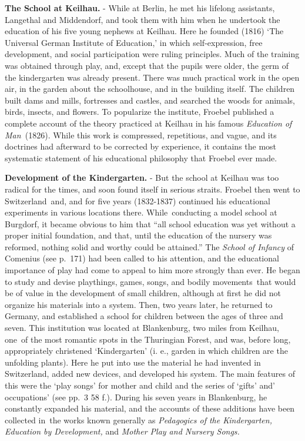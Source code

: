 \documentclass[]{book}
\begin{document}
\textbf{The School at Keilhau.} - While at Berlin, he met his lifelong assistants, Langethal and Middendorf, and took them with him when he undertook the education of his five young nephews at Keilhau. Here he founded (1816) `The Universal German Institute of Education,' in which self-expression, free development, and social participation were ruling principles. Much of the training was obtained through play, and, except that the pupils were older, the germ of the kindergarten was already present. There was much practical work in the open air, in the garden about the schoolhouse, and in the building itself. The children built dams and mills, fortresses and castles, and searched the woods for animals, birds, insects, and flowers. To popularize the institute, Froebel published a complete account of the theory practiced at Keilhau in his famous \emph{Education of Man~}(1826). While this work is compressed, repetitious, and vague, and its doctrines had afterward to be corrected by experience, it contains the most systematic statement of his educational philosophy that Froebel ever made.

\textbf{Development of the Kindergarten.} - But the school at Keilhau was too radical for the times, and soon found itself in serious straits. Froebel then went to Switzerland~and, and for five years (1832-1837) continued his educational experiments in various locations there. While~conducting a model school at Burgdorf, it became obvious to him that ``all school education was yet without a proper initial foundation, and that, until the education of the nursery was reformed, nothing solid and worthy could be attained.'' The \emph{School of Infancy} of Comenius (see p.~171) had been called to his attention, and the educational importance of play had come to appeal to him more strongly than ever. He began to study and devise playthings, games, songs, and bodily movements~that would be of value in the development of small children, although at first he did not organize his materials into a system. Then, two years later, he returned to Germany, and established a school for children between the ages of three and seven. This institution was located at Blankenburg, two miles from Keilhau, one~of the most romantic spots in the Thuringian Forest, and was, before long, appropriately christened `Kindergarten' (i. e., garden in which children are the unfolding plants). Here he put into use the material he had invented in Switzerland, added new devices, and developed his system. The main features of this were the `play songs' for mother and child and the series of `gifts' and' occupations' (see pp.~3 58 f.). During his seven years in Blankenburg, he constantly expanded his material, and the accounts of these additions have been collected in~the works known generally as \emph{Pedagogics of the Kindergarten, Education by Development,} and \emph{Mother Play and Nursery Songs.}
\end{document}
